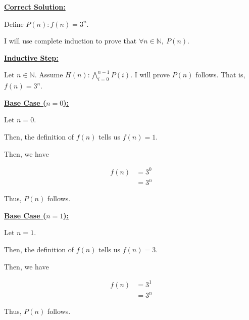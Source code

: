 \documentclass[12pt]{article}
\begin{document}
\begin{mdframed}
    \underline{\textbf{Correct Solution:}}

    \bigskip

    Define $P(n):f(n) = 3^n$.

    \bigskip

    I will use complete induction to prove that \color{red}$\forall n \in \mathbb{N}, \:P(n)$\color{black}.

    \bigskip

    \color{red}
    \underline{\textbf{Inductive Step:}}

    \bigskip

    Let $n \in \mathbb{N}$. Assume $H(n):\bigwedge\limits_{i=0}^{n-1} P(i)$. I will prove $P(n)$ follows.
    That is, $f(n) = 3^n$.
    \color{black}

    \bigskip

    \underline{\textbf{Base Case ($n = 0$):}}

    \bigskip

    Let $n = 0$.

    \bigskip

    Then, the definition of $f(n)$ tells us $f(n) = 1$.

    \bigskip

    Then, we have

    \begin{align}
        f(n) &= 3^0\\
        &= 3^n
    \end{align}

    \bigskip

    Thus, $P(n)$ follows.

    \bigskip

    \underline{\textbf{Base Case ($n = 1$):}}

    \bigskip

    Let $n = 1$.

    \bigskip

    Then, the definition of $f(n)$ tells us $f(n) = 3$.

    \bigskip

    Then, we have

    \begin{align}
        f(n) &= 3^1\\
        &= 3^n
    \end{align}

    \bigskip

    Thus, $P(n)$ follows.


\end{mdframed}
\end{document}
